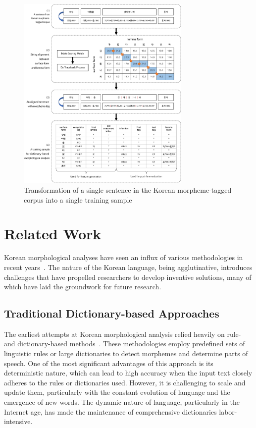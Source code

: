 \documentclass[AMS,STIX2COL]{WileyNJD-v2}
\begin{document}
    \begin{figure}[t]
        \centerline{\includegraphics[width=0.75\textwidth]{fig1.1}}
        \caption{Transformation of a single sentence in the Korean morpheme-tagged corpus into a single training sample}\label{fig:sample}
    \end{figure}


    \section{Related Work}\label{sec:related-work}

    Korean morphological analyses have seen an influx of various methodologies in recent years~\cite{KwonHC1991, LeeDG2009, ShimKS2011, LeeJS2011, ShinJC2012, LeeCK2013, NaSH2014, NaSH2015, HwangHS2016, KimHM2016, ChungES2016, LeeCH2016, Li2017, NaSH2018, KimSW2018, ChoiYS2018, MinJW2018, MinJW2019, KimHM2019, SongHJ2019, MinJW2020, SongHJ2020, ChoiYS2020, HwangHS2020, KimHJ2021, YounJY2021, MinJW2022, KimJM2022, ShinHJ2023}.
    The nature of the Korean language, being agglutinative, introduces challenges that have propelled researchers to develop inventive solutions, many of which have laid the groundwork for future research.

    \subsection{Traditional Dictionary-based Approaches}\label{subsec2.1}
    The earliest attempts at Korean morphological analysis relied heavily on rule- and dictionary-based methods~\cite{KwonHC1991}.
    These methodologies employ predefined sets of linguistic rules or large dictionaries to detect morphemes and determine parts of speech.
    One of the most significant advantages of this approach is its deterministic nature, which can lead to high accuracy when the input text closely adheres to the rules or dictionaries used.
    However, it is challenging to scale and update them, particularly with the constant evolution of language and the emergence of new words.
    The dynamic nature of language, particularly in the Internet age, has made the maintenance of comprehensive dictionaries labor-intensive.
\end{document}
